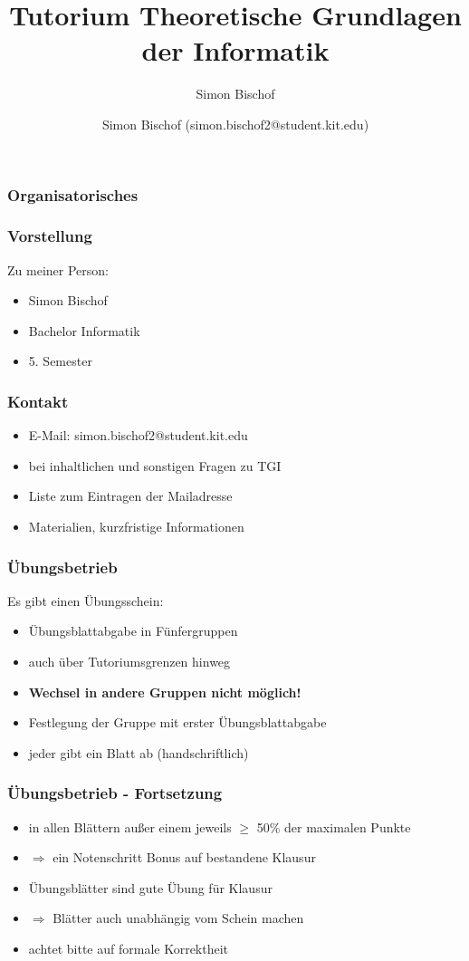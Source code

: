 \documentclass{beamer}
\author{Simon Bischof (simon.bischof2@student.kit.edu)}
\title{Tutorium Theoretische Grundlagen der Informatik}
\subtitle{Simon Bischof}
\institute{Institut f\"{u}r Kryptographie und Sicherheit}
\begin{document}
\begin{frame}
\maketitle
\end{frame}

\begin{frame}
\frametitle{Organisatorisches}
\end{frame}

\begin{frame}
\frametitle{Vorstellung}
Zu meiner Person:\pause
\begin{itemize}
\item Simon Bischof
\item Bachelor Informatik
\item 5. Semester
\end{itemize}
\end{frame}

\begin{frame}
\frametitle{Kontakt}
\begin{itemize}
\item E-Mail: simon.bischof2@student.kit.edu \pause
\item bei inhaltlichen und sonstigen Fragen zu TGI \pause
\item Liste zum Eintragen der Mailadresse
\item Materialien, kurzfristige Informationen
\end{itemize}
\end{frame}

\begin{frame}
\frametitle{Übungsbetrieb}
Es gibt einen Übungsschein:
\begin{itemize}
\item Übungsblattabgabe in Fünfergruppen
\item auch über Tutoriumsgrenzen hinweg \pause
\item \textbf{Wechsel in andere Gruppen nicht möglich!} \pause
\item Festlegung der Gruppe mit erster Übungsblattabgabe \pause
\item jeder gibt ein Blatt ab (handschriftlich)
\end{itemize}
\end{frame}

\begin{frame}
\frametitle{Übungsbetrieb - Fortsetzung}
\begin{itemize}
\item in allen Blättern außer einem jeweils $\geq$ 50\% der maximalen Punkte
\item $\Rightarrow$ ein Notenschritt Bonus auf bestandene Klausur \pause
\item Übungsblätter sind gute Übung für Klausur
\item $\Rightarrow$ Blätter auch unabhängig vom Schein machen \pause
\item achtet bitte auf formale Korrektheit
\end{itemize}
\end{frame}
\end{document}
